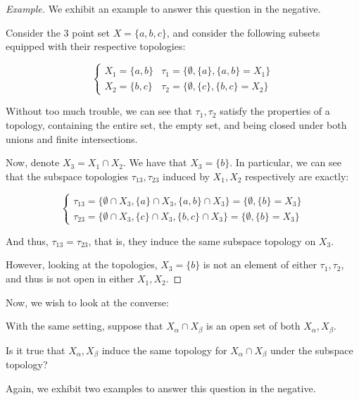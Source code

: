 \documentclass[10pt]{article}
\newenvironment{problem}[2][]{\begin{trivlist}
\item[\hskip \labelsep {\bfseries #1}\hskip \labelsep {\bfseries #2.}]}{\end{trivlist}}
\begin{document}
\begin{proof}[Example]

We exhibit an example to answer this question in the negative.

Consider the 3 point set $X = \{ a, b, c \}$, and consider the following subsets equipped with their respective topologies:

$$\begin{cases} X_1 = \{ a, b \} & \tau_1 = \{ \emptyset, \{ a \}, \{ a, b \} = X_1 \} \\  X_2 = \{ b,c \} & \tau_2 = \{ \emptyset, \{ c \}, \{ b,c \} = X_2 \} \end{cases} $$

Without too much trouble, we can see that $\tau_1, \tau_2$ satisfy the properties of a topology, containing the entire set, the empty set, and being closed under both unions and finite intersections.

Now, denote $X_{3}= X_1 \cap X_2$. We have that $X_{3} = \{ b \}$. In particular, we can see that the subspace topologies $\tau_{13}, \tau_{23}$ induced by $X_1, X_2$ respectively are exactly:

$$ \begin{cases} \tau_{13} =  \{ \emptyset \cap X_3, \{ a \} \cap X_3, \{ a, b \} \cap X_3\} = \{ \emptyset, \{ b \} = X_3 \} \\  \tau_{23} =  \{ \emptyset \cap X_3, \{ c \} \cap X_3, \{ b,c \} \cap X_3\} = \{ \emptyset, \{ b \} = X_3 \} \end{cases} $$

And thus, $\tau_{13} = \tau_{23}$, that is, they induce the same subspace topology on $X_3$.

However, looking at the topologies, $X_3 = \{ b \}$ is not an element of either $\tau_1, \tau_2$, and thus is not open in either $X_1, X_2$.

\end{proof}

\begin{problem}{Question 2}

Now, we wish to look at the converse:

With the same setting, suppose that $X_\alpha \cap X_\beta$ is an open set of both $X_\alpha, X_\beta$.

Is it true that $X_\alpha, X_\beta$ induce the same topology for $X_\alpha \cap X_\beta$ under the subspace topology?

\end{problem}

Again, we exhibit two examples to answer this question in the negative.
\end{document}
